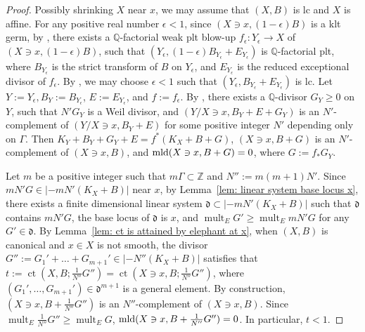 \documentclass[11pt]{amsart}
\numberwithin{equation}{section}
\newcommand{\Qq}{\mathbb{Q}}
\newcommand{\Zz}{\mathbb{Z}}
\newcommand{\mld}{{\rm{mld}}}
\newcommand{\ct}{\operatorname{ct}}
\newcommand{\mult}{\operatorname{mult}}
\newcommand{\Ii}{{\Gamma}}
\theoremstyle{definition}
\theoremstyle{definition}
\begin{document}
\begin{proof}
Possibly shrinking $X$ near $x$, we may assume that $(X,B)$ is lc and $X$ is affine. For any positive real number $\epsilon<1$, since $(X\ni x,(1-\epsilon)B)$ is a klt germ, by \cite[Lemmas 3.12 and 3.13]{HLS19}, there exists a $\Qq$-factorial weak plt blow-up $f_{\epsilon}:Y_{\epsilon}\to X$ of $(X\ni x,(1-\epsilon)B)$, such that $(Y_{\epsilon},(1-\epsilon)B_{Y_{\epsilon}}+E_{Y_{\epsilon}})$ is $\Qq$-factorial plt, where $B_{Y_{\epsilon}}$ is the strict transform of $B$ on $Y_{\epsilon}$, and $E_{Y_{\epsilon}}$ is the reduced exceptional divisor of $f_{\epsilon}$. By \cite[Theorem 1.1]{HMX14}, we may choose $\epsilon<1$ such that $(Y_{\epsilon},B_{Y_{\epsilon}}+E_{Y_{\epsilon}})$ is lc. Let $Y:=Y_{\epsilon},B_Y:=B_{Y_{\epsilon}}$, $E:=E_{Y_{\epsilon}}$, and $f:=f_{\epsilon}$. By \cite[Corollary 3.20]{HLS19}, there exists a $\Qq$-divisor $G_Y\ge 0$ on $Y$, such that $N'G_Y$ is a Weil divisor, and $(Y/X\ni x,B_Y+E+G_Y)$ is an $N'$-complement of $(Y/X\ni x,B_Y+E)$ for some positive integer $N'$ depending only on $\Ii$. Then $K_Y+B_Y+G_Y+E=f^*(K_X+B+G)$, $(X\ni x,B+G)$ is an $N'$-complement of $(X\ni x,B)$, and $\mld(X\ni x,B+G)=0$, where $G:=f_{*}G_Y$.


Let $m$ be a positive integer such that $m\Ii\subset \Zz$ and $N'':=m(m+1)N'$. Since $mN'G\in |-mN'(K_X+B)|$ near $x$, by Lemma~\ref{lem: linear system base locus x}, there exists a finite dimensional linear system $\mathfrak{d}\subset |-mN'(K_X+B)|$ such that $\mathfrak{d}$ contains $mN'G$, the base locus of ${{\mathfrak {d}}}$ is $x$, and $\mult_E G'\geq \mult_E mN'G$ for any $G'\in \mathfrak{d}$. By Lemma~\ref{lem: ct is attained by elephant at x}, when $(X,B)$ is canonical and $x\in X$ is not smooth, the divisor $G'':=G_1'+\dots+G_{m+1}'\in |-N''(K_X+B)|$ satisfies that $t:=\ct(X,B;\frac{1}{N''}G'')=\ct(X\ni x,B;\frac{1}{N''}G'')$, where $(G_1',\dots,G_{m+1}')\in \mathfrak{d}^{m+1}$ is a general element. By construction, $(X\ni x,B+\frac{1}{N''}G'')$ is an $N''$-complement of $(X\ni x,B)$. Since $\mult_E \frac{1}{N''}G''\geq \mult_E G$, $\mld(X\ni x,B+\frac{1}{N''}G'')=0$. In particular, $t<1$.



\end{proof}
\end{document}
